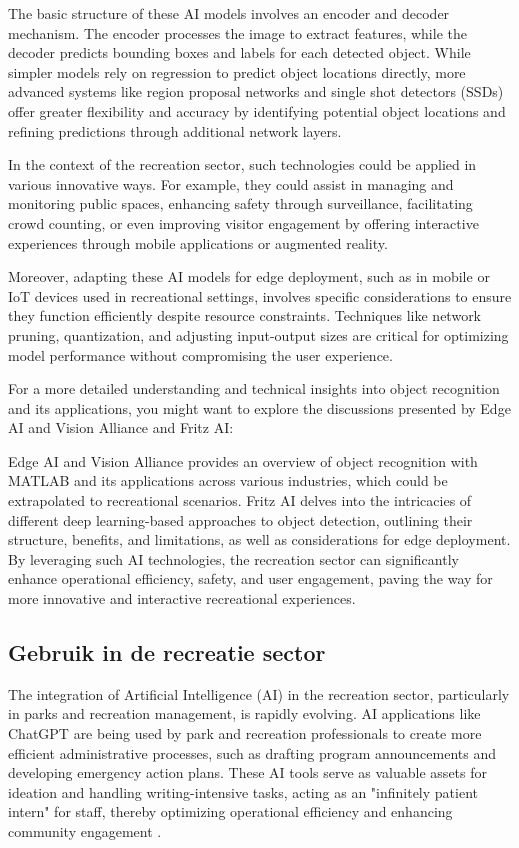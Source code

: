 The basic structure of these AI models involves an encoder and decoder mechanism. The encoder processes the image to extract features, while the decoder predicts bounding boxes and labels for each detected object. While simpler models rely on regression to predict object locations directly, more advanced systems like region proposal networks and single shot detectors (SSDs) offer greater flexibility and accuracy by identifying potential object locations and refining predictions through additional network layers.

In the context of the recreation sector, such technologies could be applied in various innovative ways. For example, they could assist in managing and monitoring public spaces, enhancing safety through surveillance, facilitating crowd counting, or even improving visitor engagement by offering interactive experiences through mobile applications or augmented reality.

Moreover, adapting these AI models for edge deployment, such as in mobile or IoT devices used in recreational settings, involves specific considerations to ensure they function efficiently despite resource constraints. Techniques like network pruning, quantization, and adjusting input-output sizes are critical for optimizing model performance without compromising the user experience.

For a more detailed understanding and technical insights into object recognition and its applications, you might want to explore the discussions presented by Edge AI and Vision Alliance and Fritz AI:

Edge AI and Vision Alliance provides an overview of object recognition with MATLAB and its applications across various industries, which could be extrapolated to recreational scenarios.
Fritz AI delves into the intricacies of different deep learning-based approaches to object detection, outlining their structure, benefits, and limitations, as well as considerations for edge deployment.
By leveraging such AI technologies, the recreation sector can significantly enhance operational efficiency, safety, and user engagement, paving the way for more innovative and interactive recreational experiences.

\subsection{Gebruik in de recreatie sector}

The integration of Artificial Intelligence (AI) in the recreation sector, particularly in parks and recreation management, is rapidly evolving. AI applications like ChatGPT are being used by park and recreation professionals to create more efficient administrative processes, such as drafting program announcements and developing emergency action plans. These AI tools serve as valuable assets for ideation and handling writing-intensive tasks, acting as an "infinitely patient intern" for staff, thereby optimizing operational efficiency and enhancing community engagement \autocite{ParksRecAI2023}.

